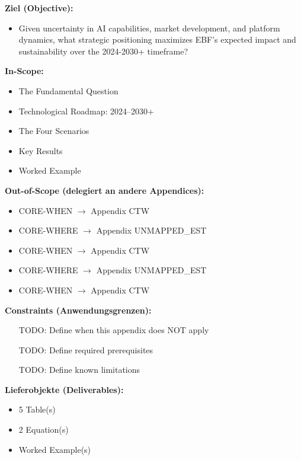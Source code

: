 \begin{tcolorbox}[
    colback=orange!5!white,
    colframe=orange!75!black,
    title={\textbf{Appendix Scope: Ziel / In-Scope / Out-of-Scope / Constraints}},
    fonttitle=\bfseries
]

\textbf{Ziel (Objective):}
\begin{itemize}[nosep]
    \item Given uncertainty in AI capabilities, market development, and platform
dynamics, what strategic positioning maximizes EBF's expected impact and
sustainability over the 2024-2030+ timeframe?
\end{itemize}

\textbf{In-Scope:}
\begin{itemize}[nosep]
    \item The Fundamental Question
    \item Technological Roadmap: 2024--2030+
    \item The Four Scenarios
    \item Key Results
    \item Worked Example
\end{itemize}

\textbf{Out-of-Scope (delegiert an andere Appendices):}
\begin{itemize}[nosep]
    \item CORE-WHEN $\rightarrow$ Appendix CTW
    \item CORE-WHERE $\rightarrow$ Appendix UNMAPPED_EST
    \item CORE-WHEN $\rightarrow$ Appendix CTW
    \item CORE-WHERE $\rightarrow$ Appendix UNMAPPED_EST
    \item CORE-WHEN $\rightarrow$ Appendix CTW
\end{itemize}

\textbf{Constraints (Anwendungsgrenzen):}
\begin{itemize}[nosep]
    \item [TODO: Define when this appendix does NOT apply]
    \item [TODO: Define required prerequisites]
    \item [TODO: Define known limitations]
\end{itemize}

\textbf{Lieferobjekte (Deliverables):}
\begin{itemize}[nosep]
    \item 5 Table(s)
    \item 2 Equation(s)
    \item Worked Example(s)
\end{itemize}

\end{tcolorbox}


